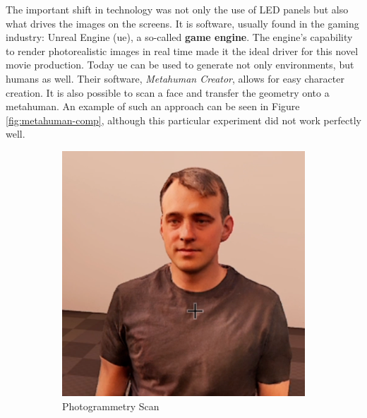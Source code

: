 \documentclass[
  a4paper,  %
  twoside,  %
  bibliography=totoc,
  headsepline,
  cleardoublepage=empty,
  parskip=half,
  draft=false
]{scrbook}
\begin{document}
The important shift in technology was not only the use of LED panels but also what drives the images on the screens. It is software, usually found in the gaming industry: Unreal Engine (\gls{ue}), a so-called \textbf{game engine}. The engine's capability to render photorealistic images in real time made it the ideal driver for this novel movie production. Today \gls{ue} can be used to generate not only environments, but humans as well. Their software, \textit{Metahuman Creator}, allows for easy character creation. It is also possible to scan a face and transfer the geometry onto a metahuman. An example of such an approach can be seen in Figure \ref{fig:metahuman-comp}, although this particular experiment did not work perfectly well. 

\begin{figure}[h]
  \centering
  \begin{subfigure}[b]{0.45\textwidth}
    \includegraphics[width=\textwidth]{./graphics/photogrammetry.png}
    \caption{Photogrammetry Scan}
    \label{fig:head-photogrammetry-scan}
  \end{subfigure}
  \hfill
  \begin{subfigure}[b]{0.5\textwidth}

\end{subfigure}
\end{figure}
\end{document}
